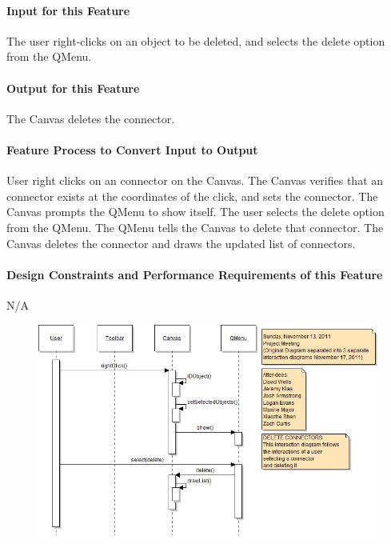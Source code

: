 \documentclass[twoside,letterpaper]{article}
\begin{document}
{\paragraph[Input for this Feature]{Input for this Feature}
{\color{black}
The user right-clicks on an object to be deleted, and selects the delete option from the QMenu.
}

\paragraph{Output for this Feature}
{\color{black}
The Canvas deletes the connector.
}

\paragraph{Feature Process to Convert Input to Output}
{\color{black}
User right clicks on an connector on the Canvas. The Canvas verifies that an connector exists at the coordinates of the click, and sets the connector.  The Canvas prompts the QMenu to show itself.  The user selects the delete option from the QMenu.  The QMenu tells the Canvas to delete that connector. The Canvas deletes the connector and draws the updated list of connectors.
}

\paragraph{Design Constraints and Performance Requirements of this Feature}
{\color{black}
N/A
}
\bigskip
\bigskip

\begin{figure}[h]
\centering
\includegraphics[width=6.0in]{IntDelConn.jpg}
\end{figure}

}
\end{document}
